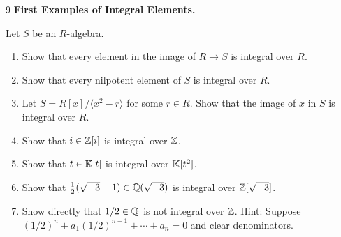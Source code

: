 \documentclass[Notebook.tex]{subfiles}
\begin{document}
\hrulefill

\newpage 

\begin{problem}{9} \textbf{First Examples of Integral Elements.} 
    
    Let $S$ be an $R$-algebra.
    \begin{enumerate}
        \item Show that every element in the image of $R\to S$ is integral over $R$.
        \item Show that every nilpotent element of $S$ is integral over $R$.
        \item Let $S=R[x]/\langle x^2-r\rangle$ for some $r\in R$. Show that the image of $x$ in $S$ is integral over $R$.
        \item Show that $i\in \mathbb Z[i]$ is integral over $\mathbb Z$.
        \item Show that $t\in \mathbb K[t]$ is integral over $\mathbb K[t^2]$.
        \item Show that $\frac{1}{2}(\sqrt{-3}+1)\in \mathbb Q(\sqrt{-3})$ is integral over $\mathbb Z[\sqrt{-3}]$. 
        \item Show directly that $1/2\in \mathbb Q$ is not integral over $\mathbb Z$. Hint: Suppose $(1/2)^n+a_1(1/2)^{n-1}+\cdots+a_n=0$ and clear denominators.   
    \end{enumerate}
\end{problem}
\end{document}

